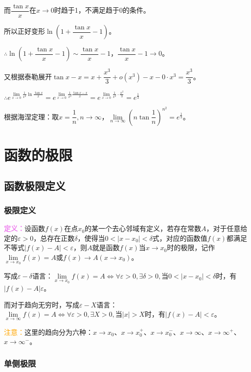 \documentclass[UTF8, 12pt]{ctexart}
\begin{document}
而$\dfrac{\tan x}{x}$在$x\to 0$时趋于1，不满足趋于0的条件。

所以正好变形$\ln\left(1+\dfrac{\tan x}{x}-1\right)$。

$\therefore \ln\left(1+\dfrac{\tan x}{x}-1\right)\sim\dfrac{\tan x}{x}-1$，$\dfrac{\tan x}{x}-1\to 0$。

又根据泰勒展开$\tan x-x=x+\dfrac{x^3}{3}+o(x^3)-x-0\cdot x^3=\dfrac{x^3}{3}$。

$\therefore e^{\lim\limits_{x\to 0}\frac{1}{x^2}\ln\frac{\tan x}{x}}=e^{\lim\limits_{x\to 0}\frac{1}{x^2}\frac{\tan x-x}{x}}=e^{\lim\limits_{x\to 0}\frac{1}{x^2}\cdot\frac{x^2}{3}}=e^{\frac{1}{3}}$

根据海涅定理：取$x=\dfrac{1}{n},n\to\infty$，$\lim\limits_{n\to\infty}\left(n\tan\dfrac{1}{n}\right)^{n^2}=e^{\frac{1}{3}}$。

\section{函数的极限}

\subsection{函数极限定义}

\subsubsection{极限定义}

\textcolor{violet}{\textbf{定义：}}设函数$f(x)$在点$x_0$的某一个去心邻域有定义，若存在常数$A$，对于任意给定的$\varepsilon>0$，总存在正数$\delta$，使得当$0<\vert x-x_0\vert<\delta$式，对应的函数值$f(x)$都满足不等式$\vert f(x)-A\vert <\varepsilon$，则$A$就是函数$f(x)$当$x\to x_0$时的极限，记作$\lim\limits_{x\to x_0}f(x)=A$或$f(x)\rightarrow A(x\rightarrow x_0)$。

写成$\varepsilon-\delta$语言：$\lim\limits_{x\to x_0}f(x)=A\Leftrightarrow\forall\varepsilon>0,\exists\delta>0,\text{当}0<\vert x-x_0\vert<\delta$时，有$\vert f(x)-A\vert\varepsilon$。

而对于趋向无穷时，写成$\varepsilon-X$语言：$\lim\limits_{x\to\infty}f(x)=A\Leftrightarrow\forall\varepsilon>0,\exists X>0,\text{当}\vert x\vert>X$时，有$\vert f(x)-A\vert<\varepsilon$。

\textcolor{orange}{注意：}这里的趋向分为六种：$x\to x_0$、$x\to x_0^+$、$x\to x_0^-$、$x\to\infty$、$x\to\infty^+$、$x\to\infty^-$。

\subsubsection{单侧极限}
\end{document}
